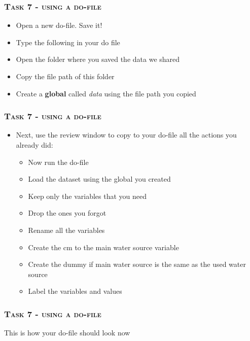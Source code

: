 \documentclass[10pt]{beamer}
\begin{document}
	\begin{frame}
		\frametitle{\textsc{Task 7 - using a do-file}}
		\begin{itemize}
			\item Open a new do-file. Save it! 

			\item Type the following in your do file
			\end{itemize}
\begin{stlog}\end{stlog}
		\begin{itemize}
			\item Open the folder where you saved the data we shared
			\item Copy the file path of this folder
			\item Create a \textbf{global} called \textit{data} using the file path you copied
		\end{itemize}
\begin{stlog}\end{stlog}
	\end{frame}
		
	\begin{frame}
		\frametitle{\textsc{Task 7 - using a do-file}}
		
		
	\begin{itemize}
			\item Next, use the review window to copy to your do-file all the actions you already did:
			\begin{itemize}
				\item Now run the do-file
				\item Load the dataset using the global you created
				\item Keep only the variables that you need
				\item Drop the ones you forgot
				\item Rename all the variables
				\item Create the cm to the main water source variable
				\item Create the dummy if main water source is the same as the used water source
				\item Label the variables and values
			\end{itemize}
		\end{itemize}	
	\end{frame}
		
	\begin{frame}
		\frametitle{\textsc{Task 7 - using a do-file}}
		This is how your do-file should look now
\begin{stlog}\end{stlog}
	\end{frame}
\end{document}
